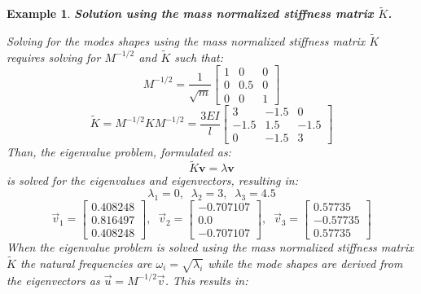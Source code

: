 \documentclass[12pt,letter]{article}
\newtheorem{ex}{Example}
\numberwithin{ex}{section} %
\newenvironment{example}{\begin{mdframed}[middlelinewidth=0.5mm]\begin{ex}\normalfont}{\end{ex}\end{mdframed}}
\numberwithin{re}{section} %
\begin{document}
\begin{example}
\vspace{2ex}
\noindent \textbf{Solution using the mass normalized stiffness matrix $\tilde{K}$.}
\vspace{1ex}

Solving for the modes shapes using the  mass normalized stiffness matrix $\tilde{K}$ requires solving for $M^{-1/2}$ and $\tilde{K}$ such that:
\begin{equation}
	  M^{-1/2} = \frac{1}{\sqrt{m}} \begin{bmatrix} 1 & 0 & 0 \\    0  & 0.5 & 0 \\ 0  & 0 & 1 \end{bmatrix}
\end{equation}
\begin{equation}
	   \tilde{K} = M^{-1/2} K M^{-1/2} = \frac{3EI}{l} \begin{bmatrix} 3 & -1.5 & 0 \\  -1.5  & 1.5 & -1.5 \\  0  & -1.5 & 3 \end{bmatrix} 
\end{equation}
Than, the eigenvalue problem, formulated as:
\begin{equation}
\tilde{K} \textbf{v} = \lambda \textbf{v}
\end{equation}
is solved for the eigenvalues and eigenvectors, resulting in:
\begin{equation}
\lambda_1 = 0, \; \; \lambda_2 = 3, \; \; \lambda_3 = 4.5
\end{equation}
\begin{equation}
\vec{v}_1 = \begin{bmatrix} 0.408248 \\    0.816497 \\    0.408248  \end{bmatrix}, \; \; \vec{v}_2 = \begin{bmatrix} -0.707107 \\    0.0 \\    -0.707107 \end{bmatrix}, \; \; \vec{v}_3 = \begin{bmatrix} 0.57735 \\    -0.57735 \\    0.57735  \end{bmatrix}
\end{equation}
When the eigenvalue problem is solved using the mass normalized stiffness matrix $\tilde{K}$ the natural frequencies are $\omega_i = \sqrt{\lambda_i}$ while the mode shapes are derived from the eigenvectors as $\vec{u}=M^{-1/2}\vec{v}$. This results in:

\end{example}
\end{document}
